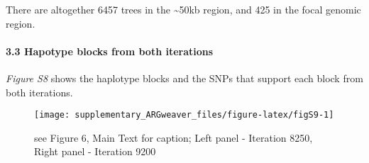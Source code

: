 \documentclass[
]{article}
\begin{document}
\hfill\break
There are altogether 6457 trees in the \textasciitilde50kb region, and
425 in the focal genomic region.

\hypertarget{hapotype-blocks-from-both-iterations}{%
\paragraph{\texorpdfstring{3.3 Hapotype blocks from both iterations\\
}{3.3 Hapotype blocks from both iterations }}\label{hapotype-blocks-from-both-iterations}}

\hfill\break
\emph{Figure S8} shows the haplotype blocks and the SNPs that support
each block from both iterations.

\begin{figure}

{\centering \texttt{[image: supplementary\_ARGweaver\_files/figure-latex/figS9-1]} 

}

\caption{see Figure 6, Main Text for caption; Left panel - Iteration 8250, Right panel - Iteration 9200}\label{fig:figS9}
\end{figure}
\end{document}

